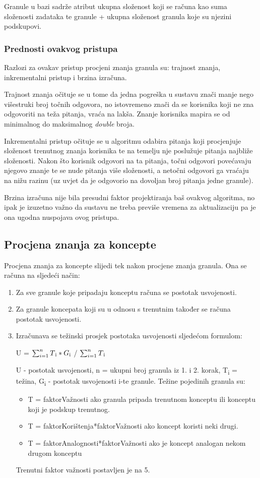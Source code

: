 \documentclass[times, utf8, zavrsni, numeric]{fer}
\begin{document}
Granule u bazi sadrže atribut ukupna složenost koji se računa kao suma složenosti zadataka te granule + ukupna složenost granula koje su njezini podskupovi.

\subsubsection{Prednosti ovakvog pristupa}
Razlozi za ovakav pristup procjeni znanja granula su: trajnost znanja, inkrementalni pristup i brzina izračuna.
\par
Trajnost znanja očituje se u tome da jedna pogreška u sustavu znači manje nego višestruki broj točnih odgovora, no istovremeno znači da se korisnika koji ne zna odgovoriti na teža pitanja, vraća na lakša. Znanje korisnika mapira se od minimalnog do maksimalnog \textit{double} broja.
\par
Inkrementalni pristup očituje se u algoritmu odabira pitanja koji procjenjuje složenost trenutnog znanja korisnika te na temelju nje poslužuje pitanja najbliže složenosti. Nakon što korisnik odgovori na ta pitanja, točni odgovori povećavaju njegovo znanje te se nude pitanja više složenosti, a netočni odgovori ga vraćaju na nižu razinu (uz uvjet da je odgovorio na dovoljan broj pitanja jedne granule).
\par
Brzina izračuna nije bila presudni faktor projektiranja baš ovakvog algoritma, no ipak je izuzetno važno da sustavu ne treba previše vremena za aktualizaciju pa je ona ugodna nuspojava ovog pristupa.

\subsection{Procjena znanja za koncepte}
Procjena znanja za koncepte slijedi tek nakon procjene znanja granula. Ona se računa na sljedeći način:
\begin{enumerate}
	\item Za sve granule koje pripadaju konceptu računa se postotak usvojenosti.
	\item Za granule koncepata koji su u odnosu s trenutnim također se računa postotak usvojenosti.
	\item Izračunava se težinski prosjek postotaka usvojenosti sljedećom formulom:
	\begin{center}
		U = $\sum_{i=1}^{n} T\textsubscript{i}*G\textsubscript{i}$ / $\sum_{i=1}^{n} T\textsubscript{i}$
	\end{center}
	U - postotak usvojenosti, n = ukupni broj granula iz 1. i 2. korak, T\textsubscript{i} = težina, G\textsubscript{i} - postotak usvojenosti i-te granule.
	Težine pojedinih granula su:
	\begin{itemize}
		\item T = faktorVažnosti ako granula pripada trenutnom konceptu ili konceptu koji je podskup trenutnog.
		\item T = faktorKorištenja*faktorVažnosti ako koncept koristi neki drugi.
		\item T = faktorAnalognosti*faktorVažnosti ako je koncept analogan nekom drugom konceptu
	\end{itemize}
	Trenutni faktor važnosti postavljen je na 5.
\end{enumerate}
\end{document}
